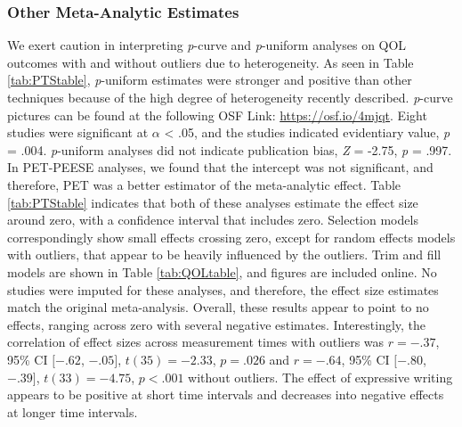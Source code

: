 \documentclass[man, mask]{apa6}
\theoremstyle{definition}
\theoremstyle{definition}
\theoremstyle{definition}
\theoremstyle{remark}
\begin{document}
\subsubsection{Other Meta-Analytic
Estimates}\label{other-meta-analytic-estimates-2}

We exert caution in interpreting \emph{p}-curve and \emph{p}-uniform
analyses on QOL outcomes with and without outliers due to heterogeneity.
As seen in Table \ref{tab:PTStable}, \emph{p}-uniform estimates were
stronger and positive than other techniques because of the high degree
of heterogeneity recently described. \emph{p}-curve pictures can be
found at the following OSF Link: \url{https://osf.io/4mjqt}. Eight
studies were significant at \(\alpha\) \textless{} .05, and the studies
indicated evidentiary value, \emph{p} = .004. \emph{p}-uniform analyses
did not indicate publication bias, \emph{Z} = -2.75, \emph{p} = .997. In
PET-PEESE analyses, we found that the intercept was not significant, and
therefore, PET was a better estimator of the meta-analytic effect. Table
\ref{tab:PTStable} indicates that both of these analyses estimate the
effect size around zero, with a confidence interval that includes zero.
Selection models correspondingly show small effects crossing zero,
except for random effects models with outliers, that appear to be
heavily influenced by the outliers. Trim and fill models are shown in
Table \ref{tab:QOLtable}, and figures are included online. No studies
were imputed for these analyses, and therefore, the effect size
estimates match the original meta-analysis. Overall, these results
appear to point to no effects, ranging across zero with several negative
estimates. Interestingly, the correlation of effect sizes across
measurement times with outliers was \(r = -.37\), 95\% CI \([-.62\),
\(-.05]\), \(t(35) = -2.33\), \(p = .026\) and \(r = -.64\), 95\% CI
\([-.80\), \(-.39]\), \(t(33) = -4.75\), \(p < .001\) without outliers.
The effect of expressive writing appears to be positive at short time
intervals and decreases into negative effects at longer time intervals.
\end{document}
